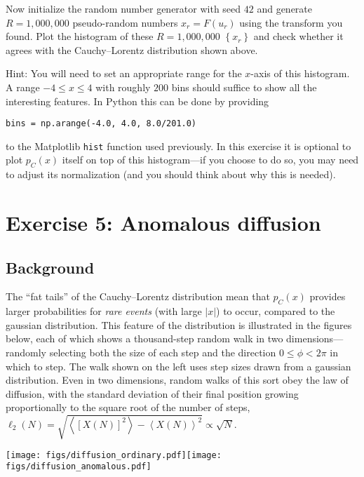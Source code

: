 \documentclass[12 pt]{article} %
\newcommand{\vev}[1]{\ensuremath{\left\langle #1 \right\rangle} }
\newcommand{\showmarks}[1]{\rightline{\texttt{[#1 marks]}}} %
\begin{document}
\showmarks{6}

Now initialize the random number generator with seed $42$ and generate $R = 1{,}000{,}000$ pseudo-random numbers $x_r = F(u_r)$ using the transform you found.
Plot the histogram of these $R = 1{,}000{,}000$ $\left\{x_r\right\}$ and check whether it agrees with the Cauchy--Lorentz distribution shown above.

Hint: You will need to set an appropriate range for the $x$-axis of this histogram.
A range $-4 \leq x \leq 4$ with roughly $200$ bins should suffice to show all the interesting features.
In Python this can be done by providing \\
\centerline{\texttt{bins = np.arange(-4.0, 4.0, 8.0/201.0)}}
to the Matplotlib \texttt{hist} function used previously.
In this exercise it is optional to plot $p_C(x)$ itself on top of this histogram---if you choose to do so, you may need to adjust its normalization (and you should think about why this is needed).

\showmarks{8}



\section*{Exercise 5: Anomalous diffusion}
\subsection*{Background}
The ``fat tails'' of the Cauchy--Lorentz distribution mean that $p_C(x)$ provides larger probabilities for \textit{rare events} (with large $|x|$) to occur, compared to the gaussian distribution.
This feature of the distribution is illustrated in the figures below, each of which shows a thousand-step random walk in two dimensions---randomly selecting both the size of each step and the direction $0 \leq \phi < 2\pi$ in which to step.
The walk shown on the left uses step sizes drawn from a gaussian distribution.
Even in two dimensions, random walks of this sort obey the law of diffusion, with the standard deviation of their final position growing proportionally to the square root of the number of steps, $\ell_2(N) = \sqrt{\vev{\left[X(N)\right]^2} - \vev{X(N)}^2} \propto \sqrt{N}$.

\noindent\texttt{[image: figs/diffusion\_ordinary.pdf]}\hfill \texttt{[image: figs/diffusion\_anomalous.pdf]}
\end{document}
